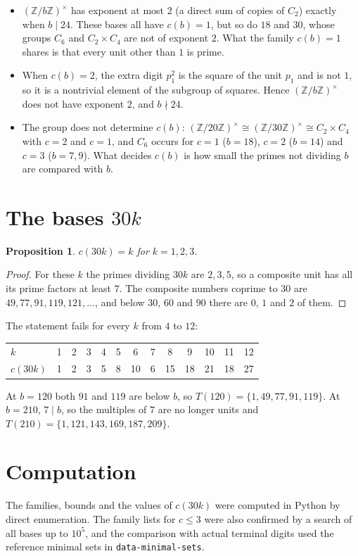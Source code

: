 \documentclass[11pt]{article}
\newtheorem{proposition}[theorem]{Proposition}
\theoremstyle{remark}
\newcommand{\Z}{\mathbb{Z}}
\newcommand{\U}[1]{(\Z/#1\Z)^{\times}}
\begin{document}
\begin{itemize}
\item $\U{b}$ has exponent at most $2$ (a direct sum of copies of $C_2$) exactly when $b\mid 24$. These bases all have $c(b)=1$, but so do $18$ and $30$, whose groups $C_6$ and $C_2\times C_4$ are not of exponent $2$. What the family $c(b)=1$ shares is that every unit other than $1$ is prime.
\item When $c(b)=2$, the extra digit $p_1^2$ is the square of the unit $p_1$ and is not $1$, so it is a nontrivial element of the subgroup of squares. Hence $\U{b}$ does not have exponent $2$, and $b\nmid 24$.
\item The group does not determine $c(b)$: $\U{20}\cong\U{30}\cong C_2\times C_4$ with $c=2$ and $c=1$, and $C_6$ occurs for $c=1$ ($b=18$), $c=2$ ($b=14$) and $c=3$ ($b=7,9$). What decides $c(b)$ is how small the primes not dividing $b$ are compared with $b$.
\end{itemize}

\section{The bases \texorpdfstring{$30k$}{30k}}

\begin{proposition}
$c(30k)=k$ for $k=1,2,3$.
\end{proposition}

\begin{proof}
For these $k$ the primes dividing $30k$ are $2,3,5$, so a composite unit has all its prime factors at least $7$. The composite numbers coprime to $30$ are $49,77,91,119,121,\dots$, and below $30$, $60$ and $90$ there are $0$, $1$ and $2$ of them.
\end{proof}

The statement fails for every $k$ from $4$ to $12$:

\begin{center}
\begin{tabular}{@{}lcccccccccccc@{}}
\toprule
$k$ & 1 & 2 & 3 & 4 & 5 & 6 & 7 & 8 & 9 & 10 & 11 & 12\\
$c(30k)$ & 1 & 2 & 3 & 5 & 8 & 10 & 6 & 15 & 18 & 21 & 18 & 27\\
\bottomrule
\end{tabular}
\end{center}

At $b=120$ both $91$ and $119$ are below $b$, so $T(120)=\{1,49,77,91,119\}$. At $b=210$, $7\mid b$, so the multiples of $7$ are no longer units and $T(210)=\{1,121,143,169,187,209\}$.

\section*{Computation}

The families, bounds and the values of $c(30k)$ were computed in Python by direct enumeration. The family lists for $c\le 3$ were also confirmed by a search of all bases up to $10^5$, and the comparison with actual terminal digits used the reference minimal sets in \texttt{data-minimal-sets}.
\end{document}
